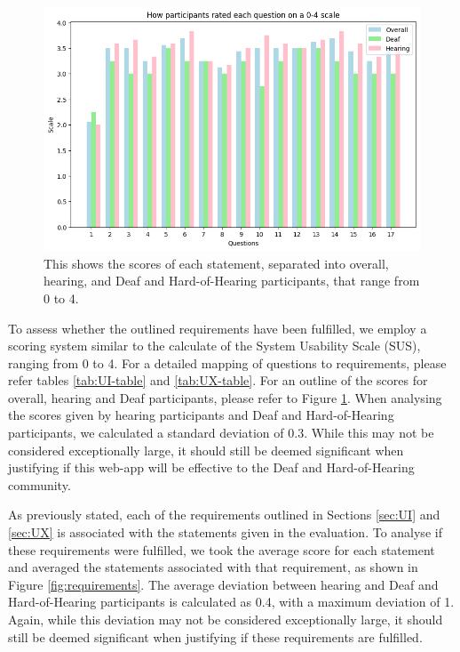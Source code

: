 \documentclass{l4proj}
\begin{document}
\begin{figure}
    \centering
    \includegraphics[width=0.75\linewidth]{dissertation/images/questions.png}    
    \caption{This shows the scores of each statement, separated into overall, hearing, and Deaf and Hard-of-Hearing participants, that range from 0 to 4.}
    \label{fig:questions}
\end{figure}


To assess whether the outlined requirements have been fulfilled, we employ a scoring system similar to the calculate of the System Usability Scale (SUS), ranging from 0 to 4. For a detailed mapping of questions to requirements, please refer tables \ref{tab:UI-table} and \ref{tab:UX-table}. For an outline of the scores for overall, hearing and Deaf participants, please refer to Figure \ref{fig:questions}. When analysing the scores given by hearing participants and Deaf and Hard-of-Hearing participants, we calculated a standard deviation of 0.3. While this may not be considered exceptionally large, it should still be deemed significant when justifying if this web-app will be effective to the Deaf and Hard-of-Hearing community.


As previously stated, each of the requirements outlined in Sections \ref{sec:UI} and \ref{sec:UX} is associated with the statements given in the evaluation. To analyse if these requirements were fulfilled, we took the average score for each statement and averaged the statements associated with that requirement, as shown in Figure \ref{fig:requirements}. The average deviation between hearing and Deaf and Hard-of-Hearing participants is calculated as 0.4, with a maximum deviation of 1. Again, while this deviation may not be considered exceptionally large, it should still be deemed significant when justifying if these requirements are fulfilled.
\end{document}
